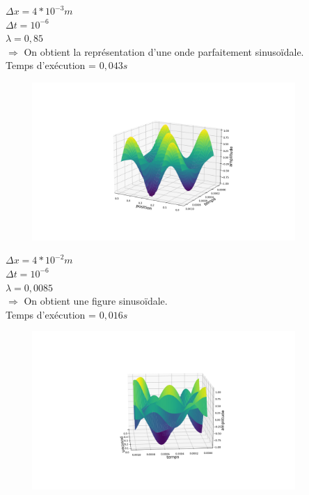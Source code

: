 \begin{enumerate}[label=\alph*)]

\begin{minipage}{.45\textwidth}%

\item $\Delta x=4*{10}^{-3}m$ \\
$\Delta t= {10}^{-6}$ \\
$\lambda= 0,85$\\


$\Longrightarrow$ On obtient la représentation d'une onde parfaitement sinusoïdale.\\
Temps d'exécution = $0,043s$

\end{minipage}%
\hfill
\begin{minipage}{.6\textwidth}%
\includegraphics[width=12cm,height=6cm]{dt=10^-6 et dx=0.004.png}

\end{minipage}%
\newline
\begin{minipage}{.45\textwidth}%
\item $\Delta x=4*{10}^{-2}m$ \\
$\Delta t= {10}^{-6}$ \\
$\lambda= 0,0085$\\


$\Longrightarrow$ On obtient une figure sinusoïdale.\\
Temps d'exécution = $0,016s$

\end{minipage}%
\begin{minipage}{.45\textwidth}%
\includegraphics[width=12cm,height=6cm]{dt=10^-6 avec dx=0.04.png}


\end{minipage}
\end{enumerate}
